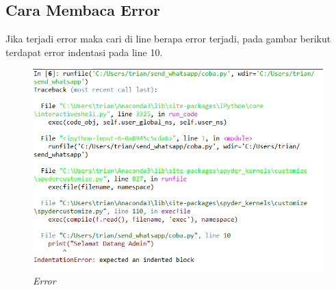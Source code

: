 \subsection{Cara Membaca Error}
Jika terjadi error maka cari di line berapa error terjadi, pada gambar berikut terdapat error indentasi pada line 10.
\begin{figure}[H]
    \centering
    \includegraphics[scale=0.6]{figures/errorindentasi}
    \caption{\textit{Error}}
    \label{Error}
\end{figure}

